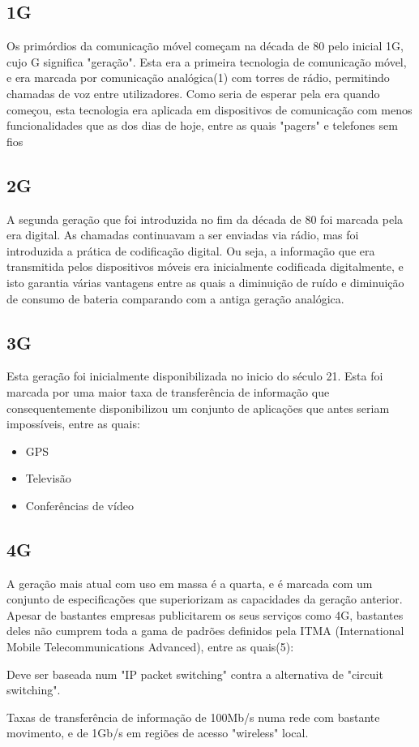 \documentclass{llncs}
\begin{document}
\subsection{1G}
\hspace*{1.5em}Os primórdios da comunicação móvel começam na década de 80 pelo inicial 1G, cujo G significa "geração". Esta era a primeira tecnologia de comunicação móvel, e era marcada por comunicação analógica(1) com torres de rádio, permitindo chamadas de voz entre utilizadores. Como seria de esperar pela era quando começou, esta tecnologia era aplicada em dispositivos de comunicação com menos funcionalidades que as dos dias de hoje, entre as quais "pagers" e telefones sem fios \cite{ Ton:Pan:Kus}
\subsection{2G}
\hspace*{1.5em}A segunda geração que foi introduzida no fim da década de 80 \cite{ Ton:Pan:Kus} foi marcada pela era digital. As chamadas continuavam a ser enviadas via rádio, mas foi introduzida a prática de codificação digital. Ou seja, a informação que era transmitida pelos dispositivos móveis era inicialmente codificada digitalmente, e isto garantia várias vantagens entre as quais a diminuição de ruído e diminuição de consumo de bateria comparando com a antiga geração analógica.
\subsection{3G}
\hspace*{1.5em}Esta geração foi inicialmente disponibilizada no inicio do século 21. Esta foi marcada por uma maior taxa de transferência de informação que consequentemente disponibilizou um conjunto de aplicações que antes seriam impossíveis, entre as quais:
\begin{itemize}
\item GPS
\item Televisão
\item Conferências de vídeo
\end{itemize}
\subsection{4G}
\hspace*{ 1.5em}A geração mais atual com uso em massa é a quarta, e é marcada com um conjunto de especificações que superiorizam as capacidades da geração anterior. Apesar de bastantes empresas publicitarem os seus serviços como 4G, bastantes deles não cumprem toda a gama de padrões definidos pela ITMA (International Mobile Telecommunications Advanced), entre as quais(5):
\begin{ itemize}
\item Deve ser baseada num "IP packet switching" contra a alternativa de "circuit switching".
\item Taxas de transferência de informação de 100Mb/s numa rede com bastante movimento, e de 1Gb/s em regiões de acesso "wireless" local.
\end{ itemize}
\end{document}
